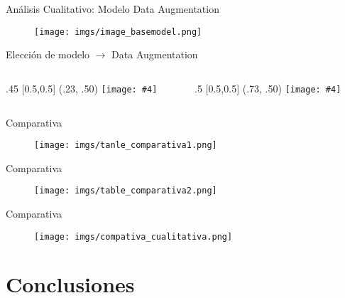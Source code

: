 \documentclass[aspectratio=43]{beamer}
\newcommand{\absimage}[4][0.5,0.5]{%
	\begin{textblock}{#3}%
		[#1]%
		(#2)%
		\texttt{[image: \#4]}%
\end{textblock}}
\begin{document}
\begin{frame}{Análisis Cualitativo: Modelo Data Augmentation}
  \begin{figure}
    \centering
    \texttt{[image: imgs/image\_basemodel.png]}
  \end{figure}
\end{frame}

\begin{frame}{Elección de modelo $\rightarrow$ Data Augmentation}

  \begin{columns}[onlytextwidth]
    \begin{column}{.35\textwidth}
      \absimage{.23, .50}{.45}{imgs/curvas_FinalModel.png}
    \end{column}
    \begin{column}{.65\textwidth}
      \absimage{.73, .50}{.5}{imgs/image_finalmodel.png}
    \end{column}
  \end{columns}
\end{frame}

\begin{frame}{Comparativa}
  \begin{figure}
    \centering
    \texttt{[image: imgs/tanle\_comparativa1.png]}
  \end{figure}
\end{frame}

\begin{frame}{Comparativa}
  \begin{figure}
    \centering
    \texttt{[image: imgs/table\_comparativa2.png]}
  \end{figure}
\end{frame}

\begin{frame}{Comparativa}
  \begin{figure}
    \centering
    \texttt{[image: imgs/compativa\_cualitativa.png]}
  \end{figure}
\end{frame}

\section{Conclusiones}
\end{document}
